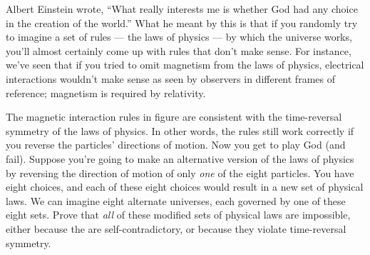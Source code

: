 Albert Einstein wrote, ``What really interests me is whether God had any
choice in the creation of the world.'' What he meant by this is that if you randomly
try to imagine a set of rules --- the laws of physics --- by which the universe
works, you'll almost certainly come up with rules that don't make sense. For instance,
we've seen that if you tried to omit magnetism from the laws of physics, electrical
interactions wouldn't make sense as seen by observers in different frames of reference;
magnetism is required by relativity.

The magnetic interaction rules in figure
 are consistent with the time-reversal symmetry of the laws of
physics. In other words, the rules still work correctly if you reverse the
particles' directions of motion. Now you get to play God (and fail).
Suppose you're going to make an alternative version of the laws of physics
by reversing the direction of motion of only \emph{one} of the eight particles.
You have eight choices, and each of these eight choices would result in a new
set of physical laws. We can imagine eight alternate universes, each governed
by one of these eight sets. Prove that \emph{all} of these modified sets of
physical laws are impossible, either because the are self-contradictory, or
because they violate time-reversal symmetry.
